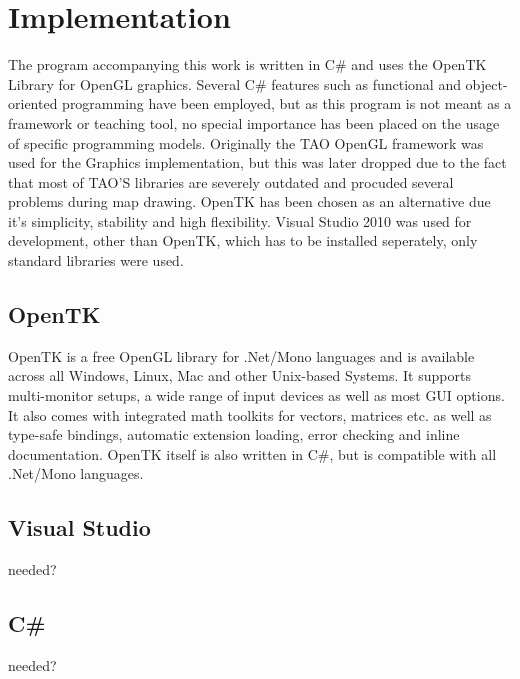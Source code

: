 \chapter{Implementation}
\label{cha:implementation}

The program accompanying this work is written in C# and uses the OpenTK Library for OpenGL graphics. Several C# features such as functional and object-oriented programming have been employed, but as this program is not meant as a framework or teaching tool, no special importance has been placed on the usage of specific programming models. 
Originally the TAO OpenGL framework was used for the Graphics implementation, but this was later dropped due to the fact that most of TAO'S libraries are severely outdated and procuded several problems during map drawing. OpenTK has been chosen as an alternative due it's simplicity, stability and high flexibility. 
Visual Studio 2010 was used for development, other than OpenTK, which has to be installed seperately, only standard libraries were used.

\section{OpenTK}
\label{sec:opentk}

OpenTK is a free OpenGL library for .Net/Mono languages and is available across all Windows, Linux, Mac and other Unix-based Systems. It supports multi-monitor setups, a wide range of input devices as well as most GUI options. It also comes with integrated math toolkits for vectors, matrices etc. as well as type-safe bindings, automatic extension loading, error checking and inline documentation. OpenTK itself is also written in C#, but is compatible with all .Net/Mono languages\cite{36}.

\section{Visual Studio}
\label{sec:visual_studio}

needed?

\section{C#}
\label{sec:c}

needed?